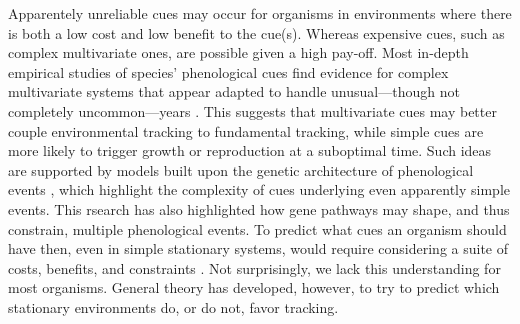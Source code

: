 \documentclass[11pt,letterpaper]{article}
\begin{document}
Apparentely unreliable cues may occur for organisms in environments where there is both a low cost and low benefit to the cue(s). Whereas expensive cues, such as complex multivariate ones, are possible given a high pay-off. Most in-depth empirical studies of species' phenological cues find evidence for complex multivariate systems that appear adapted to handle unusual---though not completely uncommon---years \citep{chuinearees}.  This suggests that multivariate cues may better couple environmental tracking to fundamental tracking, while simple cues are more likely to trigger growth or reproduction at a suboptimal time. Such ideas are supported by models built upon the genetic architecture of phenological events \citep[e.g.,][]{Wilczek:2010ad}, which highlight the complexity of cues underlying even apparently simple events. This rsearch has also highlighted how gene pathways may shape, and thus constrain, multiple phenological events. To predict what cues an organism should have then, even in simple stationary systems, would require considering a suite of costs, benefits, and constraints \citep{donahue2015,bonamour2019}. Not surprisingly, we lack this understanding for most organisms. General theory has developed, however, to try to predict which stationary environments do, or do not, favor tracking. 

\end{document}
